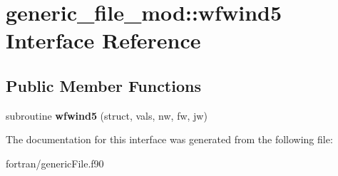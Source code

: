 \hypertarget{interfacegeneric__file__mod_1_1wfwind5}{}\section{generic\+\_\+file\+\_\+mod\+:\+:wfwind5 Interface Reference}
\label{interfacegeneric__file__mod_1_1wfwind5}
\subsection*{Public Member Functions}
\begin{DoxyCompactItemize}
\item 
\mbox{\label{interfacegeneric__file__mod_1_1wfwind5_add502aea8195f17f0cbd1f057f443c46}} 
subroutine {\bfseries wfwind5} (struct, vals, nw, fw, jw)
\end{DoxyCompactItemize}


The documentation for this interface was generated from the following file\+:\begin{DoxyCompactItemize}
\item 
fortran/generic\+File.\+f90\end{DoxyCompactItemize}
